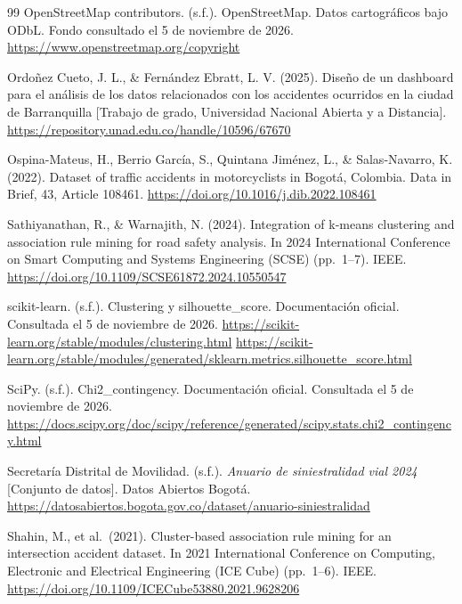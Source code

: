 \documentclass[12pt,letterpaper]{article}
\begin{document}
\begin{thebibliography}{99}
OpenStreetMap contributors. (s.f.). OpenStreetMap. Datos cartográficos bajo ODbL.
Fondo consultado el 5 de noviembre de 2026.
\url{https://www.openstreetmap.org/copyright}

Ordoñez Cueto, J. L., \& Fernández Ebratt, L. V. (2025). Diseño de un
  dashboard para el análisis de los datos relacionados con los
  accidentes ocurridos en la ciudad de Barranquilla {[}Trabajo de grado,
  Universidad Nacional Abierta y a Distancia{]}.
  \url{https://repository.unad.edu.co/handle/10596/67670}

Ospina-Mateus, H., Berrio García, S., Quintana Jiménez, L., \&
  Salas-Navarro, K. (2022). Dataset of traffic accidents in
  motorcyclists in Bogotá, Colombia. Data in Brief, 43, Article 108461.
  \url{https://doi.org/10.1016/j.dib.2022.108461}

Sathiyanathan, R., \& Warnajith, N. (2024). Integration of k-means
  clustering and association rule mining for road safety analysis. In
  2024 International Conference on Smart Computing and Systems
  Engineering (SCSE) (pp.~1--7). IEEE.
  \url{https://doi.org/10.1109/SCSE61872.2024.10550547}

scikit-learn. (s.f.). Clustering y silhouette\_score. Documentación oficial.
Consultada el 5 de noviembre de 2026.
\url{https://scikit-learn.org/stable/modules/clustering.html}
\url{https://scikit-learn.org/stable/modules/generated/sklearn.metrics.silhouette_score.html}

SciPy. (s.f.). Chi2\_contingency. Documentación oficial. Consultada el 5 de noviembre de 2026.
\url{https://docs.scipy.org/doc/scipy/reference/generated/scipy.stats.chi2_contingency.html}

Secretaría Distrital de Movilidad. (s.f.). \emph{Anuario de siniestralidad vial 2024}
[Conjunto de datos]. Datos Abiertos Bogotá.
\url{https://datosabiertos.bogota.gov.co/dataset/anuario-siniestralidad}

Shahin, M., et al.~(2021). Cluster-based association rule mining for
  an intersection accident dataset. In 2021 International Conference on
  Computing, Electronic and Electrical Engineering (ICE Cube)
  (pp.~1--6). IEEE.
  \url{https://doi.org/10.1109/ICECube53880.2021.9628206}


\end{thebibliography}
\end{document}
